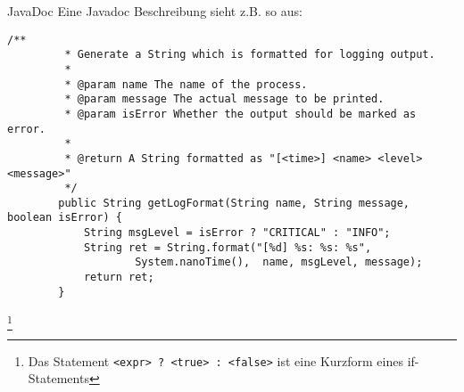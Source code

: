\begin{frame}[fragile]{JavaDoc}
    Eine Javadoc Beschreibung sieht z.B. so aus:
    \begin{lstlisting}[basicstyle=\ttfamily\scriptsize,gobble=8]
        /**
         * Generate a String which is formatted for logging output.
         *
         * @param name The name of the process.
         * @param message The actual message to be printed.
         * @param isError Whether the output should be marked as error.
         *
         * @return A String formatted as "[<time>] <name> <level> <message>"
         */
        public String getLogFormat(String name, String message, boolean isError) {
            String msgLevel = isError ? "CRITICAL" : "INFO";
            String ret = String.format("[%d] %s: %s: %s",
                    System.nanoTime(),  name, msgLevel, message);
            return ret;
        }
    \end{lstlisting}
    \let\thefootnote\relax\footnote{Das Statement \texttt{<expr> ? <true> : <false>} ist eine Kurzform eines if-Statements}
\end{frame}

